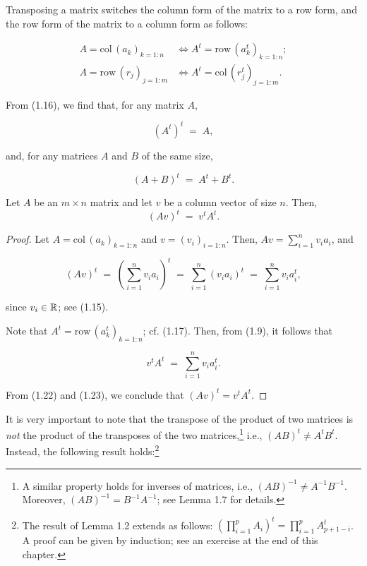 Transposing a matrix switches the column form of the matrix to a row form,
and the row form of the matrix to a column form as follows:

\begin{align}
A=\mathrm{col}\,(a_k)_{k=1:n} &\iff A^t=\mathrm{row}\,(a_k^t)_{k=1:n}; \\
A=\mathrm{row}\,(r_j)_{j=1:m} &\iff A^t=\mathrm{col}\,(r_j^t)_{j=1:m}.
\end{align}

From (1.16), we find that, for any matrix $A$,

\begin{equation}
(A^t)^t \;=\; A,
\end{equation}

and, for any matrices $A$ and $B$ of the same size,

\begin{equation}
(A+B)^t \;=\; A^t+B^t.
\end{equation}

\begin{lemma}
Let $A$ be an $m\times n$ matrix and let $v$ be a column vector of size
$n$. Then,
\begin{equation}
(Av)^t \;=\; v^tA^t.
\end{equation}
\end{lemma}

\begin{proof}
Let $A=\mathrm{col}\,(a_k)_{k=1:n}$ and $v=(v_i)_{i=1:n}$. Then,
$Av=\sum_{i=1}^n v_ia_i$, and

\begin{equation}
(Av)^t \;=\; \left(\sum_{i=1}^n v_ia_i\right)^t \;=\; \sum_{i=1}^n (v_ia_i)^t
\;=\; \sum_{i=1}^n v_ia_i^t,
\end{equation}

since $v_i\in\mathbb{R}$; see (1.15).

Note that $A^t=\mathrm{row}\,(a_k^t)_{k=1:n}$; cf. (1.17). Then, from (1.9),
it follows that

\begin{equation}
v^tA^t \;=\; \sum_{i=1}^n v_ia_i^t.
\end{equation}

From (1.22) and (1.23), we conclude that $(Av)^t = v^tA^t$.
\end{proof}

It is very important to note that the transpose of the product of two
matrices is \textit{not} the product of the transposes of the two
matrices,\footnote{A similar property holds for inverses of matrices, i.e.,
$(AB)^{-1}\ne A^{-1}B^{-1}$. Moreover, $(AB)^{-1}=B^{-1}A^{-1}$; see Lemma
1.7 for details.} i.e., $(AB)^t\ne A^tB^t$. Instead, the following result
holds:\footnote{The result of Lemma 1.2 extends as follows:
$\left(\prod_{i=1}^{p} A_i\right)^t = \prod_{i=1}^{p} A_{p+1-i}^t$. A proof
can be given by induction; see an exercise at the end of this chapter.}

